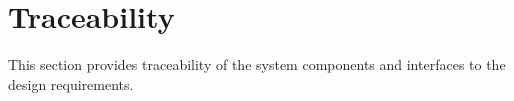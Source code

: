 
\chapter{Traceability}
\label{loc:Traceability}


This section provides traceability of the system components and interfaces to the design requirements.


